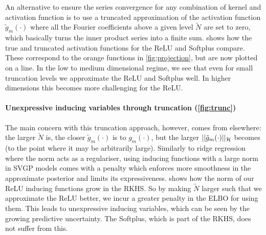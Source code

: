 An alternative to ensure the series convergence for any combination of kernel and activation function is to use a truncated approximation of the activation function $\tilde{g}_m(\cdot)$ where all the Fourier coefficients above a given level $\tilde N$ are set to zero, which basically turns the inner product series into a finite sum. %
 shows how the true and truncated activation functions for the ReLU and Softplus compare. These correspond to the orange functions in \cref{fig:projection}, but are now plotted on a line. In the low to medium dimensional regime, we see that even for small truncation levels we approximate the ReLU and Softplus well. In higher dimensions this becomes more challenging for the ReLU. %

\paragraph{Unexpressive inducing variables through truncation (\cref{fig:trunc})} The main concern with this truncation approach, however, comes from elsewhere: the larger $\tilde N$ is, the closer $\tilde{g}_m(\cdot)$ is to $g_m(\cdot)$, but the larger $\lvert\lvert \tilde{g}_m(\cdot)\rvert\rvert_{{\mathcal{H}}}$ becomes (to the point where it may be arbitrarily large). Similarly to ridge regression where the norm acts as a regulariser, using inducing functions with a large norm in SVGP models comes with a penalty which enforces more smoothness in the approximate posterior and limits its expressiveness.
 shows how the norm of our ReLU inducing functions grow in the RKHS. So by making $\tilde{N}$ larger such that we approximate the ReLU better, we incur a greater penalty in the ELBO for using them. This leads to unexpressive inducing variables, which can be seen by the growing predictive uncertainty. The Softplus, which is part of the RKHS, does not suffer from this.

% 

